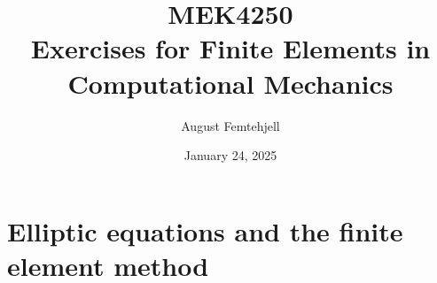 \documentclass[a4paper,12pt]{article}
\title{
    MEK4250\\
    \small{Exercises for Finite Elements in Computational Mechanics}
}
\author{August Femtehjell}
\date{January 24, 2025}
\theoremstyle{exerciseStyle}
\theoremstyle{solutionStyle}
\begin{document}
\maketitle

\tableofcontents

\section{Elliptic equations and the finite element method}


\end{document}
